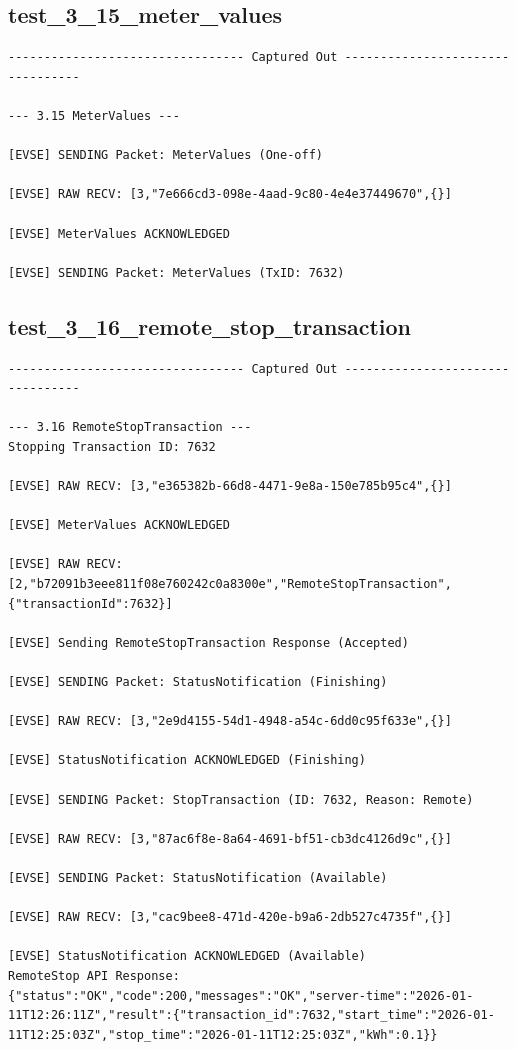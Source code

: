 \documentclass{article}
\begin{document}
\subsection*{test\_3\_15\_meter\_values}
\begin{lstlisting}
--------------------------------- Captured Out ---------------------------------

--- 3.15 MeterValues ---

[EVSE] SENDING Packet: MeterValues (One-off)

[EVSE] RAW RECV: [3,"7e666cd3-098e-4aad-9c80-4e4e37449670",{}]

[EVSE] MeterValues ACKNOWLEDGED

[EVSE] SENDING Packet: MeterValues (TxID: 7632)
\end{lstlisting}
\subsection*{test\_3\_16\_remote\_stop\_transaction}
\begin{lstlisting}
--------------------------------- Captured Out ---------------------------------

--- 3.16 RemoteStopTransaction ---
Stopping Transaction ID: 7632

[EVSE] RAW RECV: [3,"e365382b-66d8-4471-9e8a-150e785b95c4",{}]

[EVSE] MeterValues ACKNOWLEDGED

[EVSE] RAW RECV: [2,"b72091b3eee811f08e760242c0a8300e","RemoteStopTransaction",{"transactionId":7632}]

[EVSE] Sending RemoteStopTransaction Response (Accepted)

[EVSE] SENDING Packet: StatusNotification (Finishing)

[EVSE] RAW RECV: [3,"2e9d4155-54d1-4948-a54c-6dd0c95f633e",{}]

[EVSE] StatusNotification ACKNOWLEDGED (Finishing)

[EVSE] SENDING Packet: StopTransaction (ID: 7632, Reason: Remote)

[EVSE] RAW RECV: [3,"87ac6f8e-8a64-4691-bf51-cb3dc4126d9c",{}]

[EVSE] SENDING Packet: StatusNotification (Available)

[EVSE] RAW RECV: [3,"cac9bee8-471d-420e-b9a6-2db527c4735f",{}]

[EVSE] StatusNotification ACKNOWLEDGED (Available)
RemoteStop API Response: {"status":"OK","code":200,"messages":"OK","server-time":"2026-01-11T12:26:11Z","result":{"transaction_id":7632,"start_time":"2026-01-11T12:25:03Z","stop_time":"2026-01-11T12:25:03Z","kWh":0.1}}
\end{lstlisting}
\end{document}
